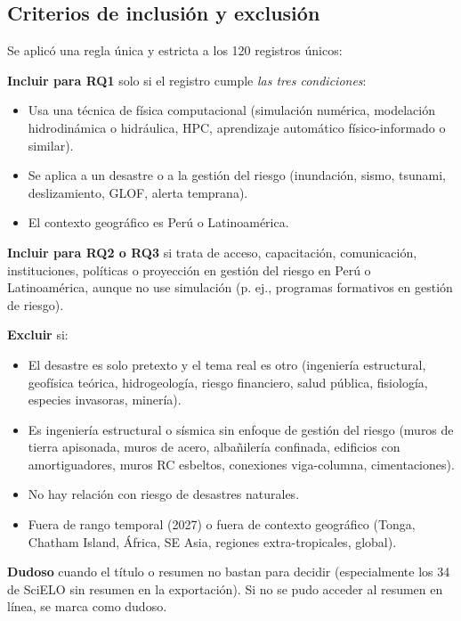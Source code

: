 \documentclass[12pt,a4paper]{article}
\begin{document}
\subsection{Criterios de inclusión y exclusión}
Se aplicó una regla única y estricta a los 120 registros únicos:

\textbf{Incluir para RQ1} solo si el registro cumple \textit{las tres condiciones}:
\begin{itemize}
  \item Usa una técnica de física computacional (simulación numérica, modelación hidrodinámica o hidráulica, HPC, aprendizaje automático físico-informado o similar).
  \item Se aplica a un desastre o a la gestión del riesgo (inundación, sismo, tsunami, deslizamiento, GLOF, alerta temprana).
  \item El contexto geográfico es Perú o Latinoamérica.
\end{itemize}

\textbf{Incluir para RQ2 o RQ3} si trata de acceso, capacitación, comunicación, instituciones, políticas o proyección en gestión del riesgo en Perú o Latinoamérica, aunque no use simulación (p. ej., programas formativos en gestión de riesgo).

\textbf{Excluir} si:
\begin{itemize}
  \item El desastre es solo pretexto y el tema real es otro (ingeniería estructural, geofísica teórica, hidrogeología, riesgo financiero, salud pública, fisiología, especies invasoras, minería).
  \item Es ingeniería estructural o sísmica sin enfoque de gestión del riesgo (muros de tierra apisonada, muros de acero, albañilería confinada, edificios con amortiguadores, muros RC esbeltos, conexiones viga-columna, cimentaciones).
  \item No hay relación con riesgo de desastres naturales.
  \item Fuera de rango temporal (2027) o fuera de contexto geográfico (Tonga, Chatham Island, África, SE Asia, regiones extra-tropicales, global).
\end{itemize}

\textbf{Dudoso} cuando el título o resumen no bastan para decidir (especialmente los 34 de SciELO sin resumen en la exportación). Si no se pudo acceder al resumen en línea, se marca como dudoso.
\end{document}
